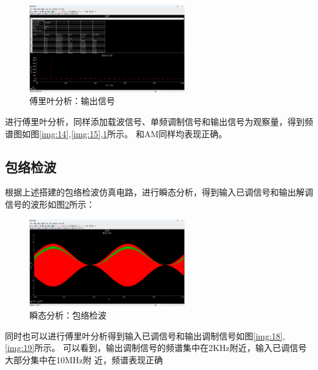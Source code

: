\documentclass[UTF8]{ctexart}
\begin{document}
\begin{figure}[htbp]
    \centering
    \includegraphics[width=0.6\textwidth]{16.png}
    \caption{傅里叶分析：输出信号}
    \label{img:16}
\end{figure}
进行傅里叶分析，同样添加载波信号、单频调制信号和输出信号为观察量，得到频
谱图如图\ref{img:14},\ref{img:15},\ref{img:16}所示。
和AM同样均表现正确。

\subsection{包络检波}
根据上述搭建的包络检波仿真电路，进行瞬态分析，得到输入已调信号和输出解调信号的波形如图\ref{img:17}所示：
\begin{figure}[htbp]
    \centering
    \includegraphics[width=0.6\textwidth]{17.png}
    \caption{瞬态分析：包络检波}
    \label{img:17}
\end{figure}
同时也可以进行傅里叶分析得到输入已调信号和输出调制信号如图\ref{img:18},\ref{img:19}所示。
可以看到，输出调制信号的频谱集中在2KHz附近，输入已调信号大部分集中在10MHz附
近，频谱表现正确
\end{document}
